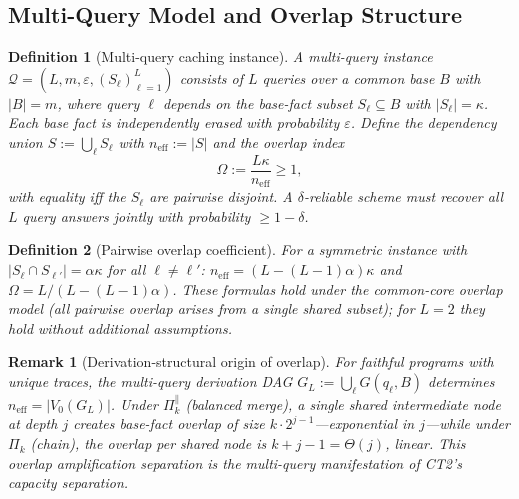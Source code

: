 \documentclass[journal]{IEEEtran}
\newtheorem{definition}{Definition}[section]
\newtheorem{remark}{Remark}[section]
\numberwithin{equation}{section}
\begin{document}
\subsection{Multi-Query Model and Overlap Structure}
\label{subsec:mq-model}

\begin{definition}[Multi-query caching instance]
\label{def:multi-query-mq}
A \emph{multi-query instance}
$\mathcal Q=(L,m,\varepsilon,(S_\ell)_{\ell=1}^L)$
consists of $L$ queries over a common base $B$ with
$|B|=m$, where query $\ell$ depends on the base-fact
subset $S_\ell\subseteq B$ with $|S_\ell|=\kappa$.
Each base fact is independently erased with probability
$\varepsilon$.
Define the \emph{dependency union}
$S:=\bigcup_\ell S_\ell$ with
$n_{\mathrm{eff}}:=|S|$ and the \emph{overlap index}
\begin{equation}\label{eq:overlap-index-mq}
  \Omega:=\frac{L\kappa}{n_{\mathrm{eff}}}\ge 1,
\end{equation}
with equality iff the $S_\ell$ are pairwise disjoint.
A $\delta$-reliable scheme must recover all $L$ query
answers jointly with probability $\ge 1{-}\delta$.
\end{definition}

\begin{definition}[Pairwise overlap coefficient]
\label{def:pairwise-overlap-mq}
For a symmetric instance with
$|S_\ell\cap S_{\ell'}|=\alpha\kappa$ for all
$\ell\ne\ell'$:
$n_{\mathrm{eff}}=(L{-}(L{-}1)\alpha)\kappa$ and
$\Omega=L/(L{-}(L{-}1)\alpha)$.
These formulas hold under the common-core overlap model
\textup{(}all pairwise overlap arises from a single shared
subset\textup{)}; for $L=2$ they hold without additional
assumptions.
\end{definition}

\begin{remark}[Derivation-structural origin of overlap]
\label{rem:overlap-origin}
For faithful programs with unique traces, the multi-query
derivation DAG $G_L:=\bigcup_\ell G(q_\ell,B)$ determines
$n_{\mathrm{eff}}=|V_0(G_L)|$.
Under $\Pi_k^{\parallel}$ (balanced merge), a single shared
intermediate node at depth $j$ creates base-fact overlap of
size $k\cdot 2^{j-1}$---exponential in $j$---while under
$\Pi_k$ (chain), the overlap per shared node is
$k{+}j{-}1=\Theta(j)$, linear.
This \emph{overlap amplification separation} is the
multi-query manifestation of CT2's capacity separation.
\end{remark}
\end{document}
